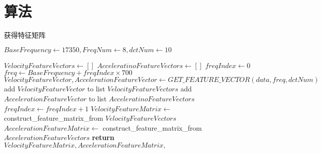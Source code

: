 \chapter{算法}
\begin{algorithm}[!htp]
\caption{获得特征矩阵}
\label{alg:get-feature-matrix}
\begin{algorithmic}[1]
 
\State $BaseFrequency \gets 17350, FreqNum \gets 8, dctNum \gets 10$ 

\State $VelocityFeatureVectors \gets []$  
\State $AcceleratinoFeatureVectors \gets []$ 
\State $freqIndex \gets 0$ 
 
\State $freq \gets BaseFrequency + freqIndex\times 700$
\State $VelocityFeatureVector,AccelerationFeatureVector \gets  GET\_FEATURE\_VECTOR(data, freq, dctNum)$
\State add $VelocityFeatureVector$ to list $VelocityFeatureVectors$ 
\State add $AccelerationFeatureVector$ to list $AcceleratinoFeatureVectors$ 
\State $freqIndex \gets freqIndex + 1$
\EndWhile\label{euclidendwhile}
\State $VelocityFeatureMatrix \gets$ construct\_feature\_matrix\_from $VelocityFeatureVectors$ 
\State $AccelerationFeatureMatrix \gets$ construct\_feature\_matrix\_from $AccelerationFeatureVectors$ 
\State \textbf{return} $VelocityFeatureMatrix,AccelerationFeatureMatrix,$
\EndProcedure
\end{algorithmic}
\end{algorithm}



